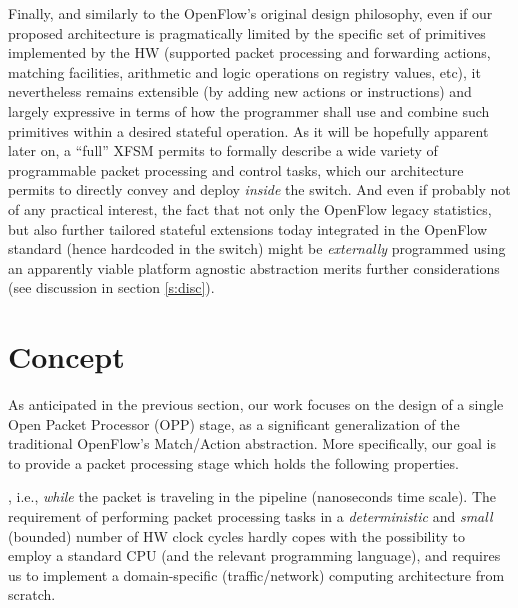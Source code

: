 \documentclass{sig-alternate}
\begin{document}
Finally, and similarly to the OpenFlow's original design philosophy, even if our proposed architecture is pragmatically  limited by the specific set of primitives implemented by the HW (supported packet processing and forwarding actions, matching facilities, arithmetic and logic operations on registry values, etc), it nevertheless remains extensible (by adding new actions or instructions) and largely expressive in terms of how the programmer shall use and combine such primitives within a desired stateful operation. As it will be hopefully apparent later on, a ``full'' XFSM permits to formally describe a wide variety of programmable packet processing and control tasks, which our architecture permits to directly convey and deploy {\em inside} the switch. And even if probably not of any practical interest, the fact that not only the OpenFlow legacy statistics, but also further tailored stateful extensions today integrated in the OpenFlow standard (hence hardcoded in the switch) might be {\em externally} programmed using an apparently viable platform agnostic abstraction merits further considerations (see discussion in section \ref{s:disc}).




\section{Concept}
\label{s:concept}

As anticipated in the previous section, our work focuses on the design of a single Open Packet Processor (OPP) stage, as a significant generalization of the traditional OpenFlow's Match/Action abstraction. More specifically, our goal is to provide a packet processing stage which holds the following properties.

\vspace{3pt} , i.e., {\em while} the packet is traveling in the pipeline (nanoseconds time scale). The requirement of performing packet processing tasks in a {\em deterministic} and {\em small} (bounded) number of HW clock cycles hardly copes with the possibility to employ a standard CPU (and the relevant programming language), and requires us to implement a domain-specific (traffic/network) computing architecture from scratch. 
 
\end{document}
